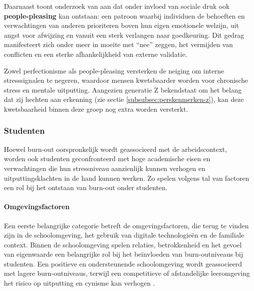 \vspace{1em}

Daarnaast toont onderzoek van \textcite{Georgescu2025} aan dat onder invloed van sociale druk ook \textbf{people-pleasing} kan ontstaan: een patroon waarbij individuen de behoeften en verwachtingen van anderen prioriteren boven hun eigen emotionele welzijn, uit angst voor afwijzing en vanuit een sterk verlangen naar goedkeuring. Dit gedrag manifesteert zich onder meer in moeite met “nee” zeggen, het vermijden van conflicten en een sterke afhankelijkheid van externe validatie.

\vspace{1em}

Zowel perfectionisme als people-pleasing versterken de neiging om interne stresssignalen te negeren, waardoor mensen kwetsbaarder worden voor chronische stress en mentale uitputting. Aangezien generatie Z bekendstaat om het belang dat zij hechten aan erkenning (zie sectie \ref{subsubsec:perskenmerken-z}), kan deze kwetsbaarheid binnen deze groep nog extra worden versterkt.

\vspace{1em}



\subsubsection{Studenten}
\label{subsubsec:studenten}

\vspace{1em}

Hoewel burn-out oorspronkelijk wordt geassocieerd met de arbeidscontext, worden ook studenten geconfronteerd met hoge academische eisen en verwachtingen die hun stressniveau aanzienlijk kunnen verhogen en uitputtingsklachten in de hand kunnen werken. Zo spelen volgens \textcite{Chong2025} tal van factoren een rol bij het ontstaan van burn-out onder studenten.

\vspace{1em}

\paragraph{Omgevingsfactoren}

\vspace{1em}

Een eerste belangrijke categorie betreft de omgevingsfactoren, die terug te vinden zijn in de schoolomgeving, het gebruik van digitale technologieën en de familiale context. Binnen de schoolomgeving spelen relaties, betrokkenheid en het gevoel van eigenwaarde een belangrijke rol bij het beïnvloeden van burn-outniveaus bij studenten. Een positieve en ondersteunende schoolomgeving wordt geassocieerd met lagere burn-outniveaus, terwijl een competitieve of afstandelijke leeromgeving het risico op uitputting en cynisme kan verhogen \autocite{Chong2025}. 

